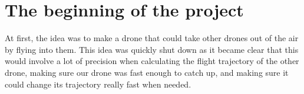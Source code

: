 
\section{The beginning of the project} 
At first, the idea was to make a drone that could take other drones out of the air by flying into them. This idea was quickly shut down as it became clear that this would involve a lot of precision when calculating the flight trajectory of the other drone, making sure our drone was fast enough to catch up, and making sure it could change its trajectory really fast when needed.

